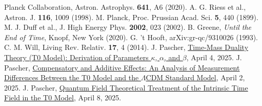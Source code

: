 \documentclass[twocolumn,aps,prl]{revtex4-2}
\begin{document}
\begin{thebibliography}{99}
		 Planck Collaboration, Astron. Astrophys. \textbf{641}, A6 (2020).
		 A. G. Riess et al., Astron. J. \textbf{116}, 1009 (1998).
		 M. Planck, Proc. Prussian Acad. Sci. \textbf{5}, 440 (1899).
		 M. J. Duff et al., J. High Energy Phys. \textbf{2002}, 023 (2002).
		 B. Greene, \textit{Until the End of Time}, Knopf, New York (2020).
		 G. 't Hooft, arXiv:gr-qc/9310026 (1993).
		 C. M. Will, Living Rev. Relativ. \textbf{17}, 4 (2014).
		 J. Pascher, \href{https://github.com/jpascher/T0-Time-Mass-Duality/tree/main/2/pdf/English/Zeit-Masse-Dualit\%C3\%A4tstheorie (T0-Modell) Herleitung der Parameter kappa, alpha und beta_en.pdf}{Time-Mass Duality Theory (T0 Model): Derivation of Parameters \(\kappa\), \(\alpha\), and \(\beta\)}, April 4, 2025.
		 J. Pascher, \href{https://github.com/jpascher/T0-Time-Mass-Duality/tree/main/2/pdf/English/Analyse der Messdifferenzen zwischen dem T0-Modell und dem Standardmodell_en.pdf}{Compensatory and Additive Effects: An Analysis of Measurement Differences Between the T0 Model and the \(\Lambda\)CDM Standard Model}, April 2, 2025.
				 J. Pascher, \href{https://github.com/jpascher/T0-Time-Mass-Duality/tree/main/2/pdf/English/Quantenfeldtheoretische Behandlung des intrinsischen Zeitfelds im T0-Modell_en.pdf}{Quantum Field Theoretical Treatment of the Intrinsic Time Field in the T0 Model}, April 8, 2025.
	\end{thebibliography}
	
\end{document}
